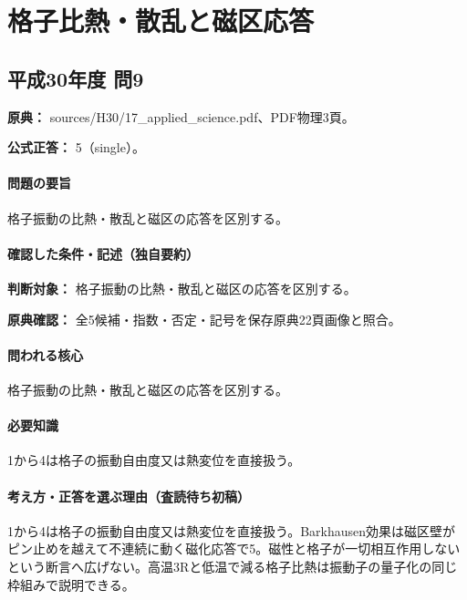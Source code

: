 \section{格子比熱・散乱と磁区応答}

\subsection{平成30年度 問9}
\label{q:h30-reg-applied-09}

\noindent\textbf{原典：} sources/H30/17\_applied\_science.pdf、PDF物理3頁。

\textbf{公式正答：} 5（single）。

\paragraph{問題の要旨} 格子振動の比熱・散乱と磁区の応答を区別する。

\paragraph{確認した条件・記述（独自要約）}\mbox{}\par

\noindent\textbf{判断対象：} 格子振動の比熱・散乱と磁区の応答を区別する。\par

\noindent\textbf{原典確認：} 全5候補・指数・否定・記号を保存原典22頁画像と照合。\par

\paragraph{問われる核心} 格子振動の比熱・散乱と磁区の応答を区別する。

\paragraph{必要知識} 1から4は格子の振動自由度又は熱変位を直接扱う。

\paragraph{考え方・正答を選ぶ理由（査読待ち初稿）} 1から4は格子の振動自由度又は熱変位を直接扱う。Barkhausen効果は磁区壁がピン止めを越えて不連続に動く磁化応答で5。磁性と格子が一切相互作用しないという断言へ広げない。高温3Rと低温で減る格子比熱は振動子の量子化の同じ枠組みで説明できる。

